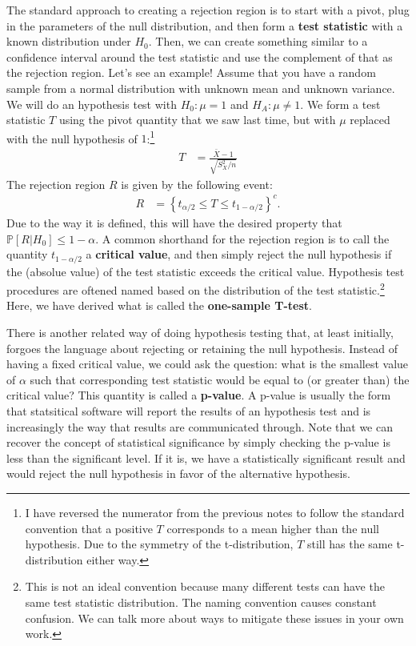 \documentclass{tufte-handout}
\newcommand{\Prob}{\mathbb{P}}
\begin{document}
The standard approach to creating a rejection region is to start with a
pivot, plug in the parameters of the null distribution, and then form a
\textbf{test statistic} with a known distribution under $H_0$. Then, we
can create something similar to a confidence interval around the test
statistic and use the complement of that as the rejection region. Let's
see an example! Assume that you have a random sample from a normal 
distribution with unknown mean and unknown variance. We will do an 
hypothesis test with $H_0: \mu = 1$ and $H_A: \mu \neq 1$. We form a
test statistic $T$ using the pivot quantity that we saw last time, but
with $\mu$ replaced with the null hypothesis of $1$:\footnote{
  I have reversed the numerator from the previous notes to follow
  the standard convention that a positive $T$ corresponds to a mean
  higher than the null hypothesis. Due to the symmetry of the
  t-distribution, $T$ still has the same t-distribution either way.
}
\begin{align*}
T &= \frac{\bar{X} - 1}{\sqrt{S_X^2 / n}} 
\end{align*}
The rejection region $R$ is given by the following event:
\begin{align*}
R &= \left\{ t_{\alpha/2} \leq T \leq t_{1 - \alpha/2} \right\}^{c}.
\end{align*}
Due to the way it is defined, this will have the desired property that
$\Prob[R|H_0] \leq 1 - \alpha$. A common shorthand for the rejection
region is to call the quantity $t_{1 - \alpha/2}$ a \textbf{critical value},
and then simply reject the null hypothesis if the (absolue value) of the
test statistic exceeds the critical value. Hypothesis test procedures
are oftened named based on the distribution of the test statistic.\footnote{
  This is not an ideal convention because many different tests can have
  the same test statistic distribution. The naming convention causes constant
  confusion. We can talk more about ways to mitigate these issues in your own
  work.
}
Here, we have derived what is called the \textbf{one-sample T-test}. 

There is another related way of doing hypothesis testing that, at least
initially, forgoes the language about rejecting or retaining the null 
hypothesis. Instead of having a fixed critical value, we could ask the
question: what is the smallest value of $\alpha$ such that corresponding
test statistic would be equal to (or greater than) the critical value? 
This quantity is called a \textbf{p-value}. A p-value is usually the 
form that statsitical software will report the results of an hypothesis
test and is increasingly the way that results are communicated through.
Note that we can recover the concept of statistical significance by 
simply checking the p-value is less than the significant level. If it
is, we have a statistically significant result and would reject the null
hypothesis in favor of the alternative hypothesis.
\end{document}
